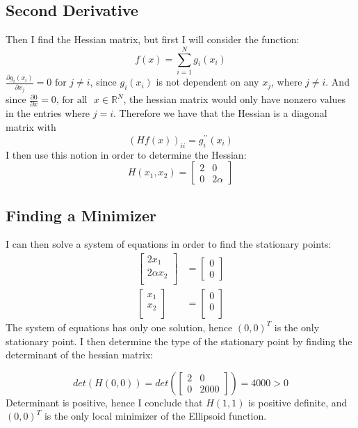 \documentclass[a4paper]{article}
\begin{document}
\subsection{Second Derivative}
Then I find the Hessian matrix, but first I will consider the function:
\[
f(x)=\sum_{i=1}^{N} g_{i}\left(x_{i}\right)
\]
$\frac{\partial g_{i}(x_{i})}{\partial x_j} = 0\text{ for }j\neq i$, since
$g_i(x_i)$ is not dependent on any $x_j$, where $j \neq i$.
And since $\frac{\partial 0}{\partial x} = 0\text{, for all }$ $x \in
\mathbb{R}^{N}$, the hessian matrix would only have nonzero values in the
entries where $j=i$. Therefore we have that the Hessian is a diagonal matrix with 
\[
(H f(x))_{i  i}=g_{i}^{\prime \prime}\left(x_{i}\right)
\]
I then use this notion in order to determine the Hessian:
\[
H(x_1, x_2) = 
\begin{bmatrix}
    2 & 0     \\
    0 & 2\alpha
\end{bmatrix}
\]

\subsection{Finding a Minimizer}
I can then solve a system of equations in order to find the stationary points:
\begin{align*}
\begin{bmatrix}
    2 x_1 \\
    2\alpha x_2 \\
\end{bmatrix}
&=
\begin{bmatrix}
    0 \\
    0    
\end{bmatrix}\\
\begin{bmatrix}
    x_1 \\
    x_2 \\
\end{bmatrix}
&=
\begin{bmatrix}
    0 \\
    0 \\
\end{bmatrix}
\end{align*}
The system of equations has only one solution, hence $(0,0)^T$ is the only
stationary point. I then determine the type of the stationary point by 
finding the determinant of the hessian matrix:

\[
det(H(0,0)) = 
det\left(\begin{bmatrix}
    2 & 0     \\
    0 & 2000
\end{bmatrix}\right)
= 4000 > 0
\]
Determinant is positive, hence I conclude that
$H(1,1)$ is positive definite, and $(0,0)^T$ is the only local minimizer of the
Ellipsoid function.
\end{document}
